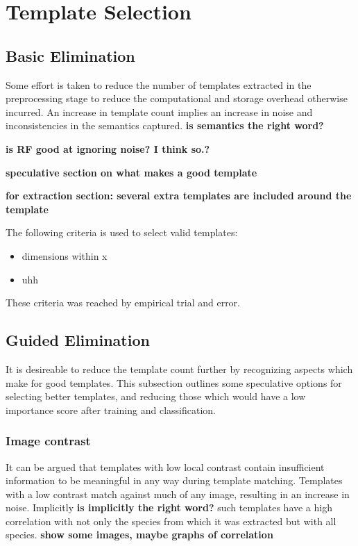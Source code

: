 \section{Template Selection}
\subsection{Basic Elimination}
Some effort is taken to reduce the number of templates extracted in the
preprocessing stage to reduce the computational and storage overhead otherwise
incurred.
An increase in template count implies an increase in noise and inconsistencies
in the semantics captured. \textbf{is semantics the right word?}

\textbf{is RF good at ignoring noise? I think so.?}

\textbf{speculative section on what makes a good template}

\textbf{for extraction section: several extra templates are included around the template}

The following criteria is used to select valid templates:
\begin{itemize}
\item dimensions within x
\item uhh
\end{itemize}
These criteria was reached by empirical trial and error.

\subsection{Guided Elimination}
It is desireable to reduce the template count further by recognizing aspects which
make for good templates. This subsection outlines some speculative options for
selecting better templates, and reducing those which would have a low importance
score after training and classification.

\subsubsection{Image contrast}
It can be argued that templates with low local contrast contain insufficient
information to be meaningful in any way during template matching.
Templates with a low contrast match against much of any image, resulting in an
increase in noise.
Implicitly \textbf{is implicitly the right word?} such templates have a high
correlation with not only the species from which it was extracted but with all
species.
\textbf{show some images, maybe graphs of correlation}


